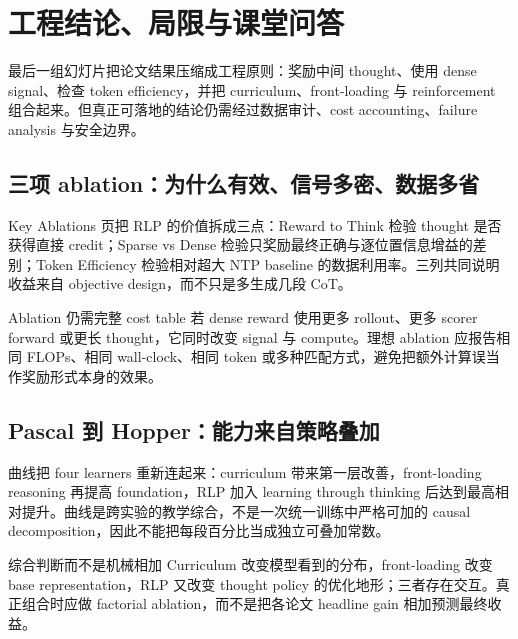 \section{工程结论、局限与课堂问答}

最后一组幻灯片把论文结果压缩成工程原则：奖励中间 thought、使用 dense signal、检查 token efficiency，并把 curriculum、front-loading 与 reinforcement 组合起来。但真正可落地的结论仍需经过数据审计、cost accounting、failure analysis 与安全边界。

\subsection{三项 ablation：为什么有效、信号多密、数据多省}

Key Ablations 页把 RLP 的价值拆成三点：Reward to Think 检验 thought 是否获得直接 credit；Sparse vs Dense 检验只奖励最终正确与逐位置信息增益的差别；Token Efficiency 检验相对超大 NTP baseline 的数据利用率。三列共同说明收益来自 objective design，而不只是多生成几段 CoT。


\begin{warningbox}{Ablation 仍需完整 cost table}
若 dense reward 使用更多 rollout、更多 scorer forward 或更长 thought，它同时改变 signal 与 compute。理想 ablation 应报告相同 FLOPs、相同 wall-clock、相同 token 或多种匹配方式，避免把额外计算误当作奖励形式本身的效果。
\end{warningbox}

\subsection{Pascal 到 Hopper：能力来自策略叠加}

曲线把 four learners 重新连起来：curriculum 带来第一层改善，front-loading reasoning 再提高 foundation，RLP 加入 learning through thinking 后达到最高相对提升。曲线是跨实验的教学综合，不是一次统一训练中严格可加的 causal decomposition，因此不能把每段百分比当成独立可叠加常数。


\begin{importantbox}{综合判断而不是机械相加}
Curriculum 改变模型看到的分布，front-loading 改变 base representation，RLP 又改变 thought policy 的优化地形；三者存在交互。真正组合时应做 factorial ablation，而不是把各论文 headline gain 相加预测最终收益。
\end{importantbox}

